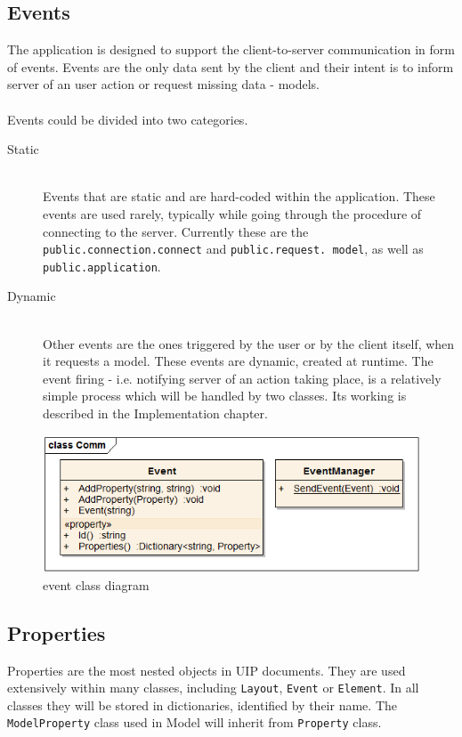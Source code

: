 \subsection{Events}
The application is designed to support the client-to-server communication in form of events. Events are the only data sent by the client and their intent is to inform server of an user action or request missing data - models.\\\\
Events could be divided into two categories.\\
\begin{description}
  \item[Static] \hfill \\
 Events that are static and are hard-coded within the application. These events are used rarely, typically while going through the procedure of connecting to the server. Currently these are the \texttt{public.connection.connect} and \texttt{public.request. model}, as well as \texttt{public.application}.
  \item[Dynamic] \hfill \\
 Other events are the ones triggered by the user or by the client itself, when it requests a model. These events are dynamic, created at runtime. The event firing - i.e. notifying server of an action taking place, is a relatively simple process which will be handled by two classes. Its working is described in the Implementation chapter.
\end{description}

\begin{figure}[ht!]
\centering
\includegraphics[width=120mm]{pics/3/classEvent.png}
\caption{event class diagram}
\label{fig:classEvent}
\end{figure}

\subsection{Properties}
Properties are the most nested objects in UIP documents. They are used extensively within many classes, including \texttt{Layout}, \texttt{Event} or \texttt{Element}. In all classes they will be stored in dictionaries, identified by their name. The \texttt{ModelProperty} class used in Model will inherit from \texttt{Property} class. 

